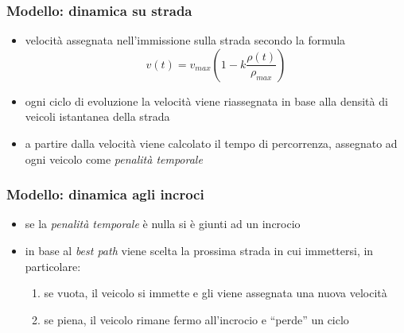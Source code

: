 \documentclass[
	11pt, %
]{beamer}
\begin{document}
\begin{frame}
	\frametitle{Modello: dinamica su strada} %

	\begin{itemize}
		\item velocit\`a assegnata nell'immissione sulla strada secondo la formula
			\begin{equation}
				v(t) = v_{max}\left(1-k\frac{\rho(t)}{\rho_{max}}\right)
			\end{equation}
		\item ogni ciclo di evoluzione la velocit\`a viene riassegnata in base alla densit\`a di veicoli istantanea della strada
		\item a partire dalla velocit\`a viene calcolato il tempo di percorrenza, assegnato ad ogni veicolo come \emph{penalit\`a temporale}
	\end{itemize}
	
\end{frame}

\begin{frame}
	\frametitle{Modello: dinamica agli incroci} %

	\begin{itemize}
		\item se la \emph{penalit\`a temporale} \`e nulla si \`e giunti ad un incrocio
		\item in base al \emph{best path} viene scelta la prossima strada in cui immettersi, in particolare:
			\begin{enumerate}
				\item se vuota, il veicolo si immette e gli viene assegnata una nuova velocit\`a
				\item se piena, il veicolo rimane fermo all'incrocio e ``perde'' un ciclo
			\end{enumerate}
	\end{itemize}
	
\end{frame}
\end{document}

